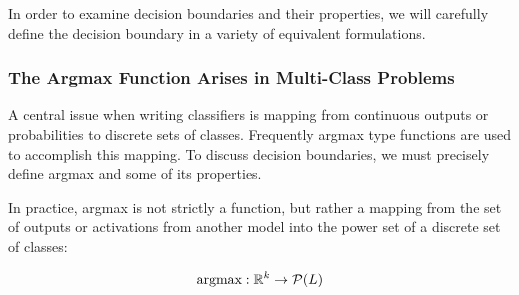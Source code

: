 In order to examine decision boundaries and their properties, we will carefully define the decision boundary in a variety of equivalent formulations. 

\subsubsection{The Argmax Function Arises in Multi-Class Problems}

A central issue when writing classifiers is mapping from continuous outputs or probabilities to discrete sets of classes. Frequently argmax type functions are used to accomplish this mapping. To discuss decision boundaries, we must precisely define argmax and some of its properties. 

In practice, argmax is not strictly a function, but rather a mapping from the set of outputs or activations from another model into the power set of a discrete set of classes:

\begin{equation}
    \text{argmax} : \mathbb{R}^k \to \mathcal{P}(L)
\end{equation}

